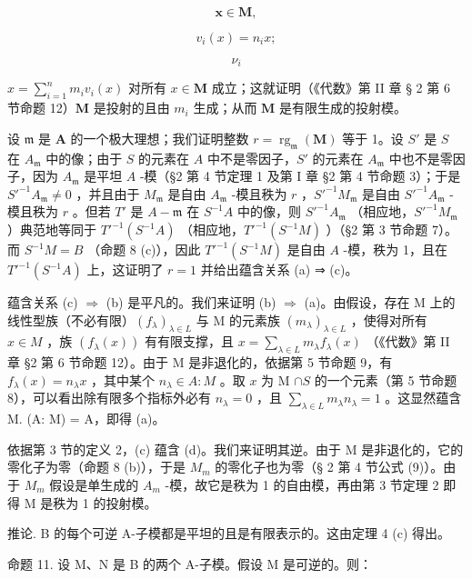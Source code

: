 \[
\boldsymbol {x} \in \mathbf {M},
\]

\[
v _ {i} (x) = n _ {i} x;
\]

\[
\nu_ {i}
\]

\(x = \sum_{i=1}^{n} m_i v_i(x)\) 对所有 \(x \in \mathbf{M}\) 成立；这就证明（《代数》第 II 章 § 2 第 6 节命题 12）\(\mathbf{M}\) 是投射的且由 \(m_i\) 生成；从而 \(\mathbf{M}\) 是有限生成的投射模。

设 \(\mathfrak{m}\) 是 \(\mathbf{A}\) 的一个极大理想；我们证明整数 \(r = \operatorname{rg}_{\mathfrak{m}}(\mathbf{M})\) 等于 1。设 \(S'\) 是 \(S\) 在 \(A_{\mathfrak{m}}\) 中的像；由于 \(S\) 的元素在 \(A\) 中不是零因子，\(S'\) 的元素在 \(A_{\mathfrak{m}}\) 中也不是零因子，因为 \(A_{\mathfrak{m}}\) 是平坦 \(A\) -模（§2 第 4 节定理 1 及第 I 章 §2 第 4 节命题 3）；于是 \(S'^{-1}A_{\mathfrak{m}} \neq 0\) ，并且由于 \(M_{\mathfrak{m}}\) 是自由 \(A_{\mathfrak{m}}\) -模且秩为 \(r\) ，\(S'^{-1}M_{\mathfrak{m}}\) 是自由 \(S'^{-1}A_{\mathfrak{m}}\) -模且秩为 \(r\) 。但若 \(T'\) 是 \(A - \mathfrak{m}\) 在 \(S^{-1}A\) 中的像，则 \(S'^{-1}A_{\mathfrak{m}}\) （相应地，\(S'^{-1}M_{\mathfrak{m}}\) ）典范地等同于 \(T'^{-1}(S^{-1}A)\) （相应地，\(T'^{-1}(S^{-1}M)\) ）（§2 第 3 节命题 7）。而 \(S^{-1}M = B\) （命题 8 (c)），因此 \(T'^{-1}(S^{-1}M)\) 是自由 \(A\) -模，秩为 1，且在 \(T'^{-1}(S^{-1}A)\) 上，这证明了 \(r = 1\) 并给出蕴含关系 (a) ⇒ (c)。

蕴含关系 (c) \(\Rightarrow\) (b) 是平凡的。我们来证明 (b) \(\Rightarrow\) (a)。由假设，存在 M 上的线性型族（不必有限）\((f_{\lambda})_{\lambda \in L}\) 与 M 的元素族 \((m_{\lambda})_{\lambda \in L}\) ，使得对所有 \(x \in M\) ，族 \((f_{\lambda}(x))\) 有有限支撑，且 \(x = \sum_{\lambda \in L} m_{\lambda} f_{\lambda}(x)\) （《代数》第 II 章 §2 第 6 节命题 12）。由于 M 是非退化的，依据第 5 节命题 9，有 \(f_{\lambda}(x) = n_{\lambda} x\) ，其中某个 \(n_{\lambda} \in A: M\) 。取 \(x\) 为 M \(\cap S\) 的一个元素（第 5 节命题 8），可以看出除有限多个指标外必有 \(n_{\lambda} = 0\) ，且 \(\sum_{\lambda \in L} m_{\lambda} n_{\lambda} = 1\) 。这显然蕴含 M. (A: M) = A，即得 (a)。

依据第 3 节的定义 2，(c) 蕴含 (d)。我们来证明其逆。由于 M 是非退化的，它的零化子为零（命题 8 (b)），于是 \(M_{m}\) 的零化子也为零（§ 2 第 4 节公式 (9)）。由于 \(M_{m}\) 假设是单生成的 \(A_{m}\) -模，故它是秩为 1 的自由模，再由第 3 节定理 2 即得 M 是秩为 1 的投射模。

推论. B 的每个可逆 A-子模都是平坦的且是有限表示的。这由定理 4 (c) 得出。

命题 11. 设 M、N 是 B 的两个 A-子模。假设 M 是可逆的。则：

